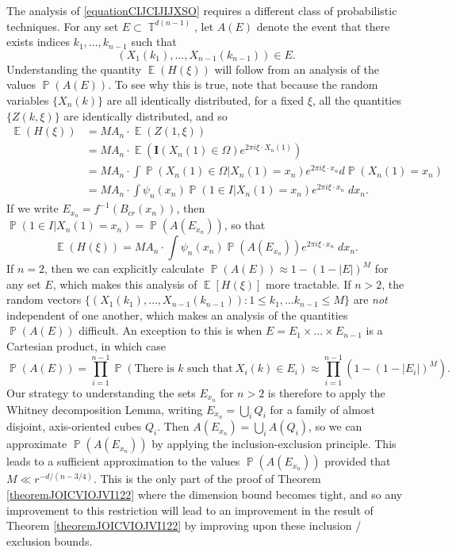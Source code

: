 \documentclass[dvipsnames,letterpaper,12pt]{article}
\numberwithin{equation}{section}
\DeclareMathOperator{\TT}{\mathbb{T}}
\numberwithin{theorem}{section}
\DeclareMathOperator{\EE}{\mathbb{E}}
\DeclareMathOperator{\PP}{\mathbb{P}}
\begin{document}
The analysis of \eqref{equationCIJCIJIJXSO} requires a different class of probabilistic techniques. For any set $E \subset \TT^{d(n-1)}$, let $A(E)$ denote the event that there exists indices $k_1,\dots, k_{n-1}$ such that
%
\[ (X_1(k_1), \dots, X_{n-1}(k_{n-1})) \in E. \]
%
Understanding the quantity $\EE(H(\xi))$ will follow from an analysis of the values $\PP(A(E))$. To see why this is true, note that because the random variables $\{ X_n(k) \}$ are all identically distributed, for a fixed $\xi$, all the quantities $\{ Z(k,\xi) \}$ are identically distributed, and so
%
\begin{align*}
    \EE(H(\xi)) &= M A_n \cdot \EE(Z(1,\xi))\\
    &= M A_n \cdot \EE( \mathbf{I}(X_n(1) \in \Omega) e^{2 \pi i \xi \cdot X_n(1)} )\\
    &= M A_n \cdot \int \PP(X_n(1) \in \Omega | X_n(1) = x_n) e^{2 \pi i \xi \cdot x_n} d\PP(X_n(1) = x_n)\\
    &= M A_n \cdot \int \psi_n(x_n) \PP(1 \in I | X_n(1) = x_n) e^{2 \pi i \xi \cdot x_n}\; dx_n.
\end{align*}
%
If we write $E_{x_n} = f^{-1}(B_{cr}(x_n))$, then $\PP(1 \in I | X_n(1) = x_n) = \PP(A(E_{x_n}))$, so that
%
\begin{equation} \label{ejowiajeoijo1ij2312j}
    \EE(H(\xi)) = MA_n \cdot \int \psi_n(x_n) \PP(A(E_{x_n})) e^{2 \pi i \xi \cdot x_n}\; dx_n.
\end{equation}
%
If $n = 2$, then we can explicitly calculate $\PP(A(E)) \approx 1 - (1 - |E|)^M$ for any set $E$, which makes this analysis of $\EE[H(\xi)]$ more tractable. If $n > 2$, the random vectors $\{ (X_1(k_1), \dots, X_{n-1}(k_{n-1})) : 1 \leq k_1, \dots k_{n-1} \leq M \}$ are \emph{not} independent of one another, which makes an analysis of the quantities $\PP(A(E))$ difficult. An exception to this is when $E = E_1 \times \dots \times E_{n-1}$ is a Cartesian product, in which case
%
\[ \PP(A(E)) = \prod_{i = 1}^{n-1} \PP(\text{There is $k$ such that}\ X_i(k) \in E_i) \approx \prod_{i = 1}^{n-1} (1 - (1 - |E_i|)^M). \]
%
Our strategy to understanding the sets $E_{x_n}$ for $n > 2$ is therefore to apply the Whitney decomposition Lemma, writing $E_{x_n} = \bigcup_i Q_i$ for a family of almost disjoint, axis-oriented cubes $Q_i$. Then $A(E_{x_n}) = \bigcup_i A(Q_i)$, so we can approximate $\PP(A(E_{x_n}))$ by applying the inclusion-exclusion principle. This leads to a sufficient approximation to the values $\PP(A(E_{x_n}))$ provided that $M \ll r^{-d/(n-3/4)}$. This is the only part of the proof of Theorem \ref{theoremJOICVIOJVI122} where the dimension bound becomes tight, and so any improvement to this restriction will lead to an improvement in the result of Theorem \ref{theoremJOICVIOJVI122} by improving upon these inclusion / exclusion bounds.
\end{document}
